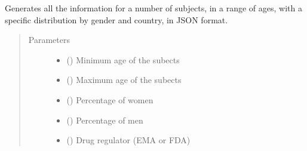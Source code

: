 \documentclass[letterpaper,10pt,english]{sphinxmanual}
\begin{document}
\begin{fulllineitems}
\label{\detokenize{CE_app.synth_phr:CE_app.synth_phr.subjects_creation.func_nihpo_subjects_creation}}
\sphinxAtStartPar
Generates all the information for a number of subjects, in a range of ages, with a specific distribution by gender and country, in JSON format.
\begin{quote}\begin{description}
\item[{Parameters}] \leavevmode\begin{itemize}
\item {} 
\sphinxAtStartPar
{} () \textendash{} Minimum age of the subects

\item {} 
\sphinxAtStartPar
{} () \textendash{} Maximum age of the subects

\item {} 
\sphinxAtStartPar
{} (\sphinxstyleliteralemphasis{\sphinxupquote{ (}}\sphinxstyleliteralemphasis{\sphinxupquote{)}}) \textendash{} Percentage of women

\item {} 
\sphinxAtStartPar
{} (\sphinxstyleliteralemphasis{\sphinxupquote{ (}}\sphinxstyleliteralemphasis{\sphinxupquote{)}}) \textendash{} Percentage of men

\item {} 
\sphinxAtStartPar
{} () \textendash{} Drug regulator (EMA or FDA)


\end{itemize}
\end{description}
\end{quote}
\end{fulllineitems}
\end{document}
